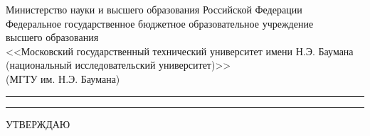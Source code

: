 
\begin{titlepage}
\singlespacing%
\thispagestyle{empty}

\ifx\wauthor\undefined\providecommand{\wauthorspace}{\vspace{7pt}}\fi

\providecommand{\wauthorspace}{}
\providecommand{\wauthor}{}
\providecommand{\wgroup}{}
\providecommand{\wfirstlead}{}
\providecommand{\wauthorfull}{}
\providecommand{\wleadprefix}{Руководитель курсового проекта}



\begin{minipage}{\textwidth}
\fontsize{10}{15}
\centering
\bfseries

Министерство науки и высшего образования Российской
Федерации\\

Федеральное государственное бюджетное образовательное учреждение\\

высшего образования\\

<<Московский государственный технический университет
имени Н.Э. Баумана\\

(национальный исследовательский университет)>>\\

(МГТУ им. Н.Э. Баумана)\\

\end{minipage}

{\vspace{5pt}
\rule{\linewidth}{3pt}

\par
\rule[20pt]{\linewidth}{1pt}
\vspace{-2em}
}

\begin{adjustbox}{minipage=0.4\textwidth,valign=T,right}
        \footnotesize
    \centering
    УТВЕРЖДАЮ


\end{adjustbox}
\end{titlepage}
